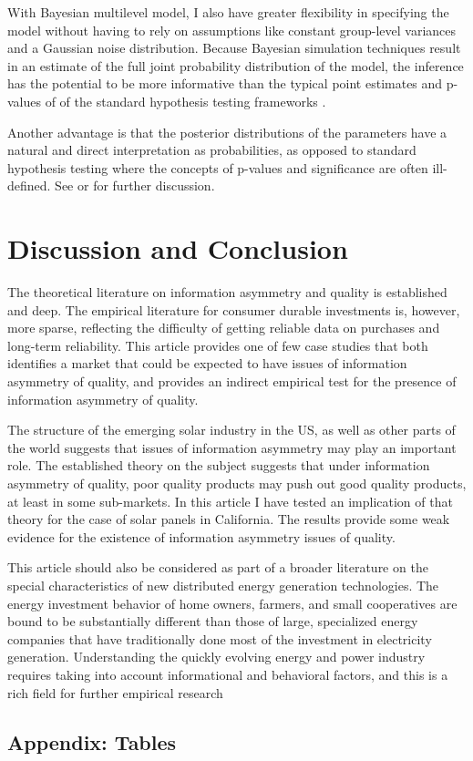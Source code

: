 \documentclass[12pt]{article}
\begin{document}
With Bayesian multilevel model, I also have greater flexibility in specifying the model without having to rely on assumptions like constant group-level variances and a Gaussian noise distribution.  Because Bayesian simulation techniques result in an estimate of the full joint probability distribution of the model, the inference has the potential to be more informative than the typical point estimates and p-values of of the standard hypothesis testing frameworks \citep{kruschke_doing_2014}.

Another advantage is that the posterior distributions of the parameters have a natural and direct interpretation as probabilities, as opposed to standard hypothesis testing where the concepts of p-values and significance are often ill-defined. See \citet{kruschke_doing_2014} or \citet{gelman_bayesian_2013} for further discussion.


\section{Discussion and Conclusion}
The theoretical literature on information asymmetry and quality is established and deep. The empirical literature for consumer durable investments is, however, more sparse, reflecting the difficulty of getting reliable data on purchases and long-term reliability. This article provides one of few case studies that both identifies a market that could be expected to have issues of information asymmetry of quality, and provides an indirect empirical test for the presence of information asymmetry of quality.

The structure of the emerging solar industry in the US, as well as other parts of the world suggests that issues of information asymmetry may play an important role. The established theory on the subject suggests that under information asymmetry of quality, poor quality products may push out good quality products, at least in some sub-markets. In this article I have tested an implication of that theory for the case of solar panels in California. The results provide some weak evidence for the existence of information asymmetry issues of quality.

This article should also be considered as part of a broader literature on the special characteristics of new distributed energy generation technologies. The energy investment behavior of home owners, farmers, and small cooperatives are bound to be substantially different than those of large, specialized energy companies that have traditionally done most of the investment in electricity generation. Understanding the quickly evolving energy and power industry requires taking into account informational and behavioral factors, and this is a rich field for further empirical research

\begin{spacing}{1}



\FloatBarrier

\appendix
\section{Appendix: Tables}


\end{spacing}
\end{document}
